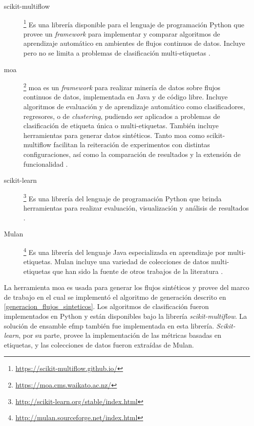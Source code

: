 \begin{description}

	\item[scikit-multiflow]\footnote{\url{https://scikit-multiflow.github.io/}} Es
	      una librería disponible para el lenguaje de programación Python que provee
	      un \textit{framework} para implementar y comparar algoritmos de aprendizaje
	      automático en ambientes de flujos continuos de datos. Incluye pero no se
	      limita a problemas de clasificación multi-etiquetas
	      \cite{montiel_scikit-multiflow_2018}.

	\item[\acrshort{moa}]\footnote{\url{https://moa.cms.waikato.ac.nz/}}
	      \acrfull{moa} es un \textit{framework} para realizar minería de datos sobre
	      flujos continuos de datos, implementada en Java y de código libre.  Incluye
	      algoritmos de evaluación y de aprendizaje automático como clasificadores,
	      regresores, o de \textit{clustering}, pudiendo ser aplicados a problemas de
	      clasificación de etiqueta única o multi-etiquetas.  También incluye
	      herramientas para generar datos sintéticos. Tanto \acrshort{moa} como
	      scikit-multiflow facilitan la reiteración de experimentos con distintas
	      configuraciones, así como la comparación de resultados y la extensión de
	      funcionalidad \cite{bifet_moa_2010}.

	\item[scikit-learn]\footnote{\url{http://scikit-learn.org/stable/index.html}}
	      Es una librería del lenguaje de programación Python que brinda
	      herramientas para realizar evaluación, visualización y análisis de
	      resultados \cite{pedregosa_scikit-learn_2018}.

	\item[Mulan]\footnote{\url{http://mulan.sourceforge.net/index.html}} Es una
	      librería del lenguaje Java especializada en aprendizaje por
	      multi-etiquetas. Mulan incluye una variedad de colecciones de datos
	      multi-etiquetas que han sido la fuente de otros trabajos de la literatura
	      \cite{tsoumakas_mulan_2011}.

\end{description} 

La herramienta \acrshort{moa} es usada para generar los flujos sintéticos y
provee del marco de trabajo en el cual se implementó el algoritmo de generación
descrito en \ref{generacion_flujos_sinteticos}. Los algoritmos de clasificación
fueron implementados en Python y están disponibles bajo la librería
\textit{scikit-multiflow}. La solución de ensamble \acrshort{efmp} también fue
implementada en esta librería. \textit{Scikit-learn}, por su parte, provee la
implementación de las métricas basadas en etiquetas, y las colecciones de datos
fueron extraídas de Mulan.

